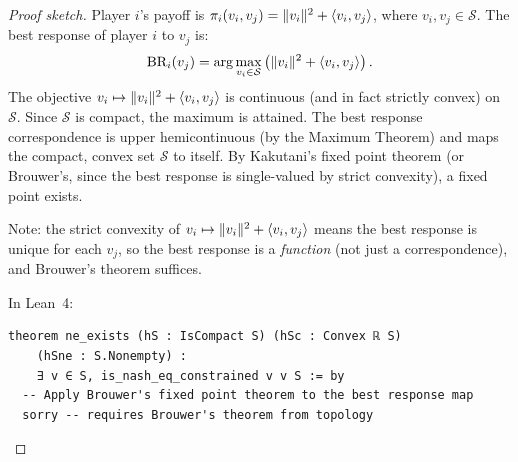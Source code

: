 \begin{proof}[Proof sketch]
Player $i$'s payoff is $\pi_{i}(v_i, v_j) = \lVert v_i \rVert^2 + \langle v_i, v_j \rangle$,
where $v_i, v_j \in \mathcal{S}$. The best response of player $i$ to $v_j$ is:
\[
  \text{BR}_i(v_j) = \arg\max_{v_i \in \mathcal{S}} \left(\lVert v_i \rVert^2 +
  \langle v_i, v_j \rangle\right).
\]
The objective $v_i \mapsto \lVert v_i \rVert^2 + \langle v_i, v_j \rangle$ is continuous (and in
fact strictly convex) on $\mathcal{S}$. Since $\mathcal{S}$ is compact, the
maximum is attained. The best response correspondence is upper hemicontinuous
(by the Maximum Theorem) and maps the compact, convex set $\mathcal{S}$ to
itself. By Kakutani's fixed point theorem (or Brouwer's, since the best
response is single-valued by strict convexity), a fixed point exists.

Note: the strict convexity of $v_i \mapsto \lVert v_i \rVert^2 + \langle v_i, v_j \rangle$ means
the best response is unique for each $v_j$, so the best response is a
\emph{function} (not just a correspondence), and Brouwer's theorem suffices.

In Lean~4:
\begin{lstlisting}
theorem ne_exists (hS : IsCompact S) (hSc : Convex ℝ S)
    (hSne : S.Nonempty) :
    ∃ v ∈ S, is_nash_eq_constrained v v S := by
  -- Apply Brouwer's fixed point theorem to the best response map
  sorry -- requires Brouwer's theorem from topology
\end{lstlisting}
\end{proof}

